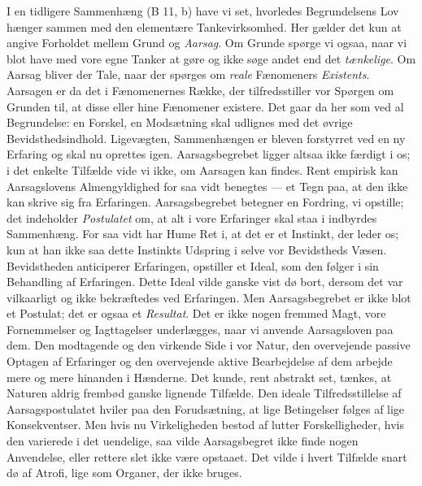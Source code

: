 \documentclass[12pt,a4paper,openany]{book}
\newcommand{\opage}[1]{\marginnote{\footnotesize\textit{[#1]}}}
\begin{document}
I en tidligere Sammenhæng (B 11, b) have vi set, hvorledes Begrundelsens
Lov hænger sammen med den elementære Tankevirksomhed. Her gælder det kun
at angive Forholdet mellem Grund og \emph{Aarsag}. Om Grunde spørge vi
ogsaa, naar vi blot have med vore egne Tanker at gøre og ikke søge andet
end det \emph{tænkelige}. Om Aarsag bliver der Tale, naar der spørges om
\emph{reale} Fænomeners \emph{Existents}. Aarsagen er da det i
Fænomenernes Række, der tilfredsstiller vor Spørgen om Grunden til, at
disse eller hine Fænomener existere. Det gaar da her som ved al
Begrundelse: en Forskel, en Modsætning skal udlignes med det øvrige
Bevidsthedsindhold. Ligevægten, Sammenhængen er bleven forstyrret ved en
ny Erfaring og skal nu oprettes igen. Aarsagsbegrebet ligger altsaa ikke
færdigt i os; i det enkelte Tilfælde vide vi ikke, om Aarsagen kan
findes. Rent empirisk kan Aarsagslovens Almengyldighed for saa vidt
benegtes --- et Tegn paa, at den ikke kan skrive sig fra Erfaringen.
Aarsagsbegrebet betegner en Fordring, vi opstille; det indeholder
\emph{Postulatet} om, at alt i vore Erfaringer skal staa i indbyrdes
Sammenhæng. For saa vidt
\opage{259}har Hume Ret i, at det er et Instinkt, der leder os; kun at
han ikke saa dette Instinkts Udspring i selve vor Bevidstheds Væsen.
Bevidstheden anticiperer Erfaringen, opstiller et Ideal, som den følger
i sin Behandling af Erfaringen. Dette Ideal vilde ganske vist dø bort,
dersom det var vilkaarligt og ikke bekræftedes ved Erfaringen. Men
Aarsagsbegrebet er ikke blot et Postulat; det er ogsaa et
\emph{Resultat}. Det er ikke nogen fremmed Magt, vore Fornemmelser og
Iagttagelser underlægges, naar vi anvende Aarsagsloven paa dem. Den
modtagende og den virkende Side i vor Natur, den overvejende passive
Optagen af Erfaringer og den overvejende aktive Bearbejdelse af dem
arbejde mere og mere hinanden i Hænderne. Det kunde, rent abstrakt set,
tænkes, at Naturen aldrig frembød ganske lignende Tilfælde. Den ideale
Tilfredsstillelse af Aarsagspostulatet hviler paa den Forudsætning, at
lige Betingelser følges af lige Konsekventser. Men hvis nu Virkeligheden
bestod af lutter Forskelligheder, hvis den varierede i det uendelige,
saa vilde Aarsagsbegret ikke finde nogen Anvendelse, eller rettere slet
ikke være opstaaet. Det vilde i hvert Tilfælde snart dø af Atrofi, lige
som Organer, der ikke bruges.
\end{document}
